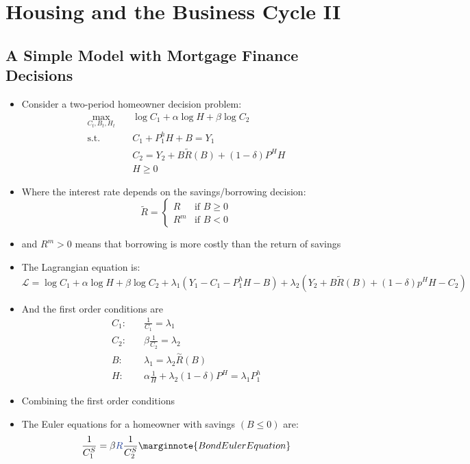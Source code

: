 \documentclass[a4paper]{article}
\begin{document}
\section{Housing and the Business Cycle II}
\subsection{A Simple Model with Mortgage Finance Decisions}
	\begin{itemize}
		\item Consider a two-period homeowner decision problem:
		\begin{align*}
			\max_{C_t,B_t,H_t}\quad &\log C_1 + \alpha\log H + \beta\log C_2 \\
			\text{s.t.}\quad &C_1 + P_1^h H + B = Y_1\\
			&C_2 = Y_2 + B\tilde{R}(B) + (1-\delta) P^H H\\
			&H \geq 0
		\end{align*}
		\item Where the interest rate depends on the savings/borrowing decision:
		\[
			\tilde{R}=
			\begin{cases}
				R &\text{if } B\geq0 \\
				R^m &\text{if } B<0
			\end{cases}
		\]
		\item and \( R^m > 0 \) means that borrowing is more costly than the return of savings
		\item The Lagrangian equation is:
		\[
			\mathcal{L} = \log C_1 + \alpha\log H + \beta\log C_2 + \lambda_1(Y_1 - C_1 - P_1^h H-B) + \lambda_2(Y_2 + B\tilde{R}(B) + (1-\delta)p^H H-C_2)
		\]
		\item And the first order conditions are
		\begin{align*}
			C_1:& \quad\frac{1}{C_1}=\lambda_1\\
			C_2:& \quad\beta\frac{1}{C_2}=\lambda_2\\
			B:& \quad\lambda_1=\lambda_2\overset{\sim}{R}(B)\\
			H:& \quad\alpha\frac{1}{H}+\lambda_2(1-\delta)P^H = \lambda_1P_1^h
		\end{align*}
		\item Combining the first order conditions
		\item The Euler equations for a homeowner with \textcolor{myblue}{savings} \( (B\leq0) \) are:
		\begin{align*}
			\frac{1}{C_1^S} &= \beta\textcolor{myblue}{R}\frac{1}{C_2^S}\marginnote{Bond Euler Equation}\\

\end{align*}
\end{itemize}
\end{document}
